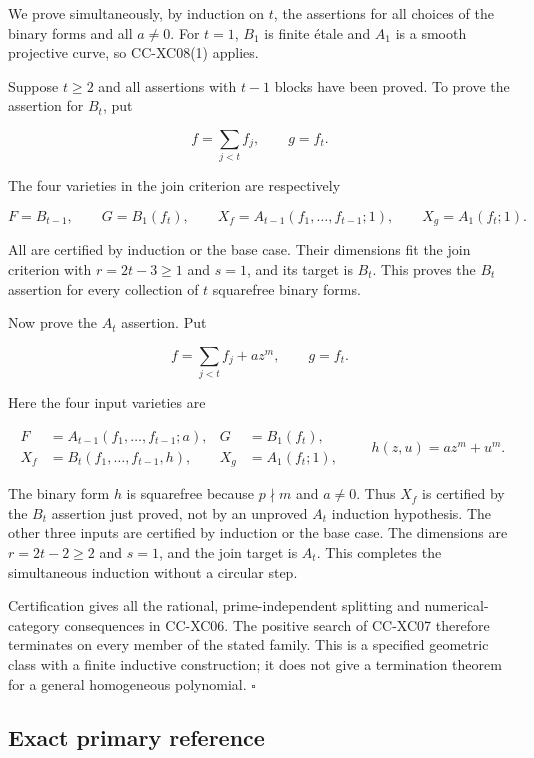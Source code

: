 We prove simultaneously, by induction on \(t\), the assertions for all
choices of the binary forms and all \(a\ne0\). For \(t=1\), \(B_1\) is
finite étale and \(A_1\) is a smooth projective curve, so CC-XC08(1)
applies.

Suppose \(t\ge2\) and all assertions with \(t-1\) blocks have been
proved. To prove the assertion for \(B_t\), put

\[
 f=\sum_{j<t}f_j,\qquad g=f_t.
\]

The four varieties in the join criterion are respectively

\[
 F=B_{t-1},\qquad G=B_1(f_t),\qquad
 X_f=A_{t-1}(f_1,\ldots,f_{t-1};1),\qquad
 X_g=A_1(f_t;1).
 \tag{CC-XC.S29}
\]

All are certified by induction or the base case. Their dimensions fit
the join criterion with \(r=2t-3\ge1\) and \(s=1\), and its target is
\(B_t\). This proves the \(B_t\) assertion for every collection of \(t\)
squarefree binary forms.

Now prove the \(A_t\) assertion. Put

\[
 f=\sum_{j<t}f_j+a z^m,\qquad g=f_t.
\]

Here the four input varieties are

\[
 \begin{aligned}
 F&=A_{t-1}(f_1,\ldots,f_{t-1};a),&
 G&=B_1(f_t),\\
 X_f&=B_t(f_1,\ldots,f_{t-1},h),&
 X_g&=A_1(f_t;1),
 \end{aligned}
 \qquad h(z,u)=a z^m+u^m.
 \tag{CC-XC.S30}
\]

The binary form \(h\) is squarefree because \(p\nmid m\) and \(a\ne0\).
Thus \(X_f\) is certified by the \(B_t\) assertion just proved, not by
an unproved \(A_t\) induction hypothesis. The other three inputs are
certified by induction or the base case. The dimensions are
\(r=2t-2\ge2\) and \(s=1\), and the join target is \(A_t\). This
completes the simultaneous induction without a circular step.

Certification gives all the rational, prime-independent splitting and
numerical-category consequences in CC-XC06. The positive search of
CC-XC07 therefore terminates on every member of the stated family. This
is a specified geometric class with a finite inductive construction; it
does not give a termination theorem for a general homogeneous
polynomial. \(\square\)

\subsection{Exact primary reference}\label{exact-primary-reference}

